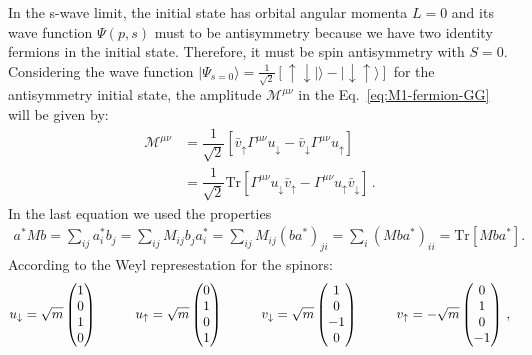 In the s-wave limit, the initial state has orbital angular momenta $L=0$ and its wave function $\Psi(p,s)$ must to be antisymmetry because we have two identity fermions in the initial state. Therefore, it must be spin antisymmetry with $S=0$.
%
Considering the wave function $|\Psi_{s=0}\rangle=\tfrac{1}{\sqrt{2}}\left[\uparrow\downarrow|\rangle-|\downarrow\uparrow\rangle\right]$ for the antisymmetry initial state, the amplitude $\mathcal{M^{\mu\nu}}$ in the Eq.~\eqref{eq:M1-fermion-GG} will be given by:
%
\begin{align}
\label{eq:muv}
\mathcal{M}^{\mu\nu}
&=\dfrac{1}{\sqrt{2}}\left[\bar{v}_{\uparrow}\Gamma^{\mu\nu}u_{\downarrow}
-\bar{v}_{\downarrow}\Gamma^{\mu\nu}u_{\uparrow}\right]\nonumber \\
&=\dfrac{1}{\sqrt{2}}\text{Tr}\left[\Gamma^{\mu\nu}u_{\downarrow}\bar{v}_{\uparrow}
-\Gamma^{\mu\nu}u_{\uparrow}\bar{v}_{\downarrow}\right]\,.
\end{align}   
In the last equation we used the properties
\begin{align*}
a^*Mb=\sum_{ij}a_i^*b_j=\sum_{ij}M_{ij}b_ja^*_i=\sum_{ij}M_{ij}(ba^*)_{ji}=\sum_i(Mba^*)_{ii}
=\text{Tr}[Mba^*].
\end{align*}
%
According to the Weyl represestation for the spinors:
\begin{align}
\label{eq:weyl_spinors}
u_{\downarrow}=\sqrt{m}
\begin{pmatrix}
1 \\ 0 \\ 1 \\ 0
\end{pmatrix}\hspace{1 cm}
u_{\uparrow}=\sqrt{m} 
\begin{pmatrix}
0 \\ 1 \\ 0 \\ 1
\end{pmatrix}
\hspace{1.0 cm}
v_{\downarrow}=\sqrt{m}
\begin{pmatrix}
1 \\ 0 \\ -1 \\ 0
\end{pmatrix}\hspace{1 cm}
v_{\uparrow}= -\sqrt{m} 
\begin{pmatrix}
0 \\ 1 \\ 0 \\ -1
\end{pmatrix}\,,
\end{align}
